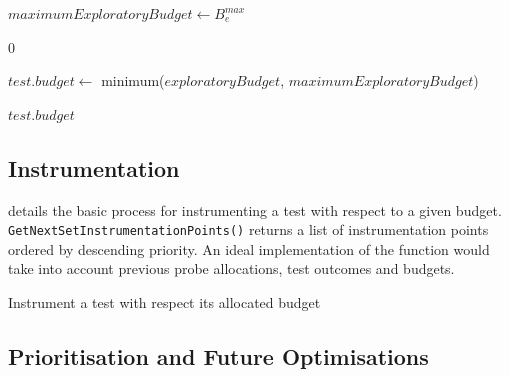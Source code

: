 {\begin{algorithm}[H]
\begin{algorithmic}[1]
	\EndFunction
	\Statex

	\Statex


	\State $maximumExploratoryBudget \gets B_{e}^{max}$

		\Return $0$
	\EndIf

	\State $test.budget \gets$ minimum($exploratoryBudget$,
	$maximumExploratoryBudget$)

	\State \Return $test.budget$

	\EndFunction
\end{algorithmic}

\end{algorithm}


\subsection{Instrumentation}

 details the basic process for instrumenting a test
with respect to a given budget. {\tt GetNextSetInstrumentationPoints()} returns
a list of instrumentation points ordered by descending priority. An ideal
implementation of the function would take into account previous probe
allocations, test outcomes and budgets.

\begin{algorithm}[H]
\caption{Instrument a test with respect its allocated budget}
\label{alg:instrument_test}

\begin{algorithmic}

			\Else
			\EndIf
		\EndFor
	\EndWhile

	\EndFunction
\end{algorithmic}

\end{algorithm}


\subsection{Prioritisation and Future Optimisations}

}
